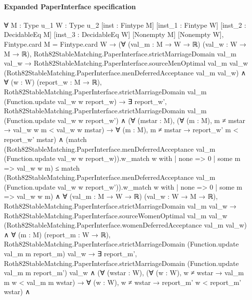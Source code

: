 \documentclass[10pt]{article}
\begin{document}
\paragraph{Expanded PaperInterface specification}
\begin{ReviewVerbatim}
∀ {M : Type u_1} {W : Type u_2} [inst : Fintype M] [inst_1 : Fintype W] [inst_2 : DecidableEq M]
  [inst_3 : DecidableEq W] [Nonempty M] [Nonempty W],
  Fintype.card M = Fintype.card W →
    (∀ (val_m : M → W → ℝ) (val_w : W → M → ℝ),
        Roth82StableMatching.PaperInterface.strictMarriageDomain val_m val_w →
          Roth82StableMatching.PaperInterface.sourceMenOptimal val_m val_w
              (Roth82StableMatching.PaperInterface.menDeferredAcceptance val_m val_w) ∧
            ∀ (w : W) (report_w : M → ℝ),
              Roth82StableMatching.PaperInterface.strictMarriageDomain val_m (Function.update val_w w report_w) →
                ∃ report_w',
                  Roth82StableMatching.PaperInterface.strictMarriageDomain val_m (Function.update val_w w report_w') ∧
                    (∀ (mstar : M),
                        (∀ (m : M), m ≠ mstar → val_w w m < val_w w mstar) →
                          ∀ (m : M), m ≠ mstar → report_w' m < report_w' mstar) ∧
                      (match
                          (Roth82StableMatching.PaperInterface.menDeferredAcceptance val_m
                                (Function.update val_w w report_w)).w_match
                            w with
                        | none => 0
                        | some m => val_w w m) ≤
                        match
                          (Roth82StableMatching.PaperInterface.menDeferredAcceptance val_m
                                (Function.update val_w w report_w')).w_match
                            w with
                        | none => 0
                        | some m => val_w w m) ∧
      ∀ (val_m : M → W → ℝ) (val_w : W → M → ℝ),
        Roth82StableMatching.PaperInterface.strictMarriageDomain val_m val_w →
          Roth82StableMatching.PaperInterface.sourceWomenOptimal val_m val_w
              (Roth82StableMatching.PaperInterface.womenDeferredAcceptance val_m val_w) ∧
            ∀ (m : M) (report_m : W → ℝ),
              Roth82StableMatching.PaperInterface.strictMarriageDomain (Function.update val_m m report_m) val_w →
                ∃ report_m',
                  Roth82StableMatching.PaperInterface.strictMarriageDomain (Function.update val_m m report_m') val_w ∧
                    (∀ (wstar : W),
                        (∀ (w : W), w ≠ wstar → val_m m w < val_m m wstar) →
                          ∀ (w : W), w ≠ wstar → report_m' w < report_m' wstar) ∧

\end{ReviewVerbatim}
\end{document}
